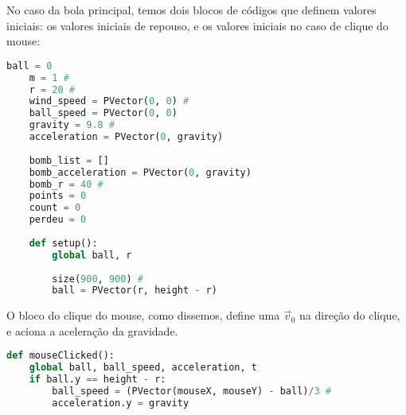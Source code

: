 \documentclass[12pt,letterpaper]{article}
\begin{document}
No caso da bola principal, temos dois blocos de códigos que definem valores iniciais: os valores iniciais de repouso, e os valores iniciais no caso de clique do mouse:

\begin{lstlisting}[language=Python]
    ball = 0
    m = 1 #
    r = 20 #
    wind_speed = PVector(0, 0) #
    ball_speed = PVector(0, 0)
    gravity = 9.8 #
    acceleration = PVector(0, gravity)
    
    bomb_list = []
    bomb_acceleration = PVector(0, gravity)
    bomb_r = 40 #
    points = 0
    count = 0
    perdeu = 0
    
    def setup():
        global ball, r
        
        size(900, 900) #
        ball = PVector(r, height - r)
\end{lstlisting}

O bloco do clique do mouse, como dissemos, define uma $\vec{v}_0$ na direção do clique, e aciona a aceleração da gravidade.

\begin{lstlisting}[language=Python]
    def mouseClicked():
    global ball, ball_speed, acceleration, t
    if ball.y == height - r:
        ball_speed = (PVector(mouseX, mouseY) - ball)/3 #
        acceleration.y = gravity
\end{lstlisting}
\end{document}
